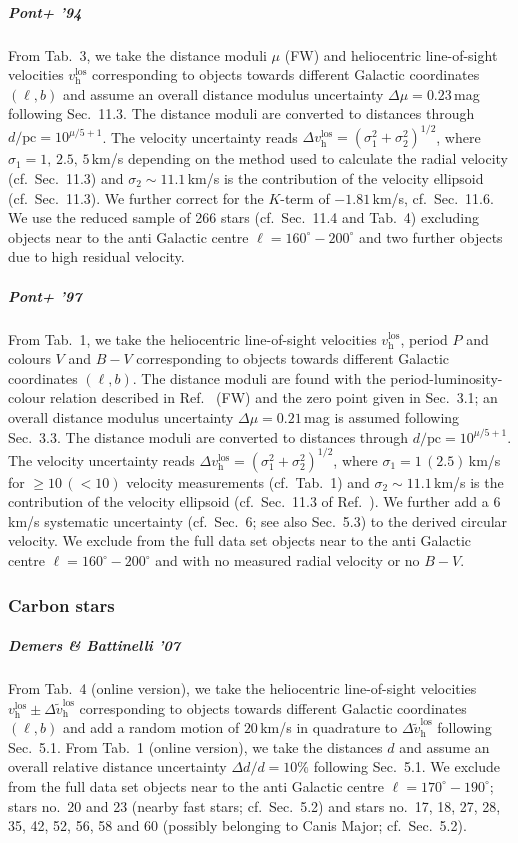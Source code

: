 \documentclass[twocolumn,prd,reprint,preprintnumbers,amsmath,amssymb,superscriptaddress,nofootinbib]{revtex4}
\begin{document}
\subparagraph{Pont+ '94 \cite{Pont1994}} From Tab.~3, we take the distance moduli $\mu$ (FW) and heliocentric line-of-sight velocities $v_{\textrm{h}}^{\textrm{los}}$ corresponding to objects towards different Galactic coordinates $(\ell,b)$ and assume an overall distance modulus uncertainty $\Delta \mu=0.23\,$mag following Sec.~11.3. The distance moduli are converted to distances through $d/\textrm{pc}=10^{\mu/5+1}$. The velocity uncertainty reads $\Delta v_{\textrm{h}}^{\textrm{los}}=(\sigma_1^2+\sigma_2^2)^{1/2}$, where $\sigma_1=1,\, 2.5,\, 5\,$km/s depending on the method used to calculate the radial velocity (cf.~Sec.~11.3) and $\sigma_2\sim11.1\,$km/s is the contribution of the velocity ellipsoid (cf.~Sec.~11.3). We further correct for the $K$-term of $-1.81\,$km/s, cf.~Sec.~11.6. We use the reduced sample of 266 stars (cf.~Sec.~11.4 and Tab.~4) excluding objects near to the anti Galactic centre $\ell=160^{\circ}-200^{\circ}$ and two further objects due to high residual velocity.

\subparagraph{Pont+ '97 \cite{Pont1997}} From Tab.~1, we take the heliocentric line-of-sight velocities $v_{\textrm{h}}^{\textrm{los}}$, period $P$ and colours $V$ and $B-V$ corresponding to objects towards different Galactic coordinates $(\ell,b)$. The distance moduli are found with the period-luminosity-colour relation described in Ref.~\cite{Pont1994} (FW) and the zero point given in Sec.~3.1; an overall distance modulus uncertainty $\Delta \mu=0.21\,$mag is assumed following Sec.~3.3. The distance moduli are converted to distances through $d/\textrm{pc}=10^{\mu/5+1}$. The velocity uncertainty reads $\Delta v_{\textrm{h}}^{\textrm{los}}=(\sigma_1^2+\sigma_2^2)^{1/2}$, where $\sigma_1=1\,(2.5)\,$km/s for $\geq10\,(<10)$ velocity measurements (cf.~Tab.~1) and $\sigma_2\sim11.1\,$km/s is the contribution of the velocity ellipsoid (cf.~Sec.~11.3 of Ref.~\cite{Pont1994}). We further add a $6\,$km/s systematic uncertainty (cf.~Sec.~6; see also Sec.~5.3) to the derived circular velocity. We exclude from the full data set objects near to the anti Galactic centre $\ell=160^{\circ}-200^{\circ}$ and with no measured radial velocity or no $B-V$.


\subsubsection{Carbon stars}

\subparagraph{Demers \& Battinelli '07 \cite{DemersBattinelli2007}} From Tab.~4 (online version), we take the heliocentric line-of-sight velocities $v_{\textrm{h}}^{\textrm{los}}\pm \Delta \tilde{v}_{\textrm{h}}^{\textrm{los}}$ corresponding to objects towards different Galactic coordinates $(\ell,b)$ and add a random motion of $20\,$km/s in quadrature to $\Delta \tilde{v}_{\textrm{h}}^{\textrm{los}}$ following Sec.~5.1. From Tab.~1 (online version), we take the distances $d$ and assume an overall relative distance uncertainty $\Delta d/d=10\%$ following Sec.~5.1. We exclude from the full data set objects near to the anti Galactic centre $\ell=170^{\circ}-190^{\circ}$; stars no.~20 and 23 (nearby fast stars; cf.~Sec.~5.2) and stars no.~17, 18, 27, 28, 35, 42, 52, 56, 58 and 60 (possibly belonging to Canis Major; cf.~Sec.~5.2).
\end{document}
